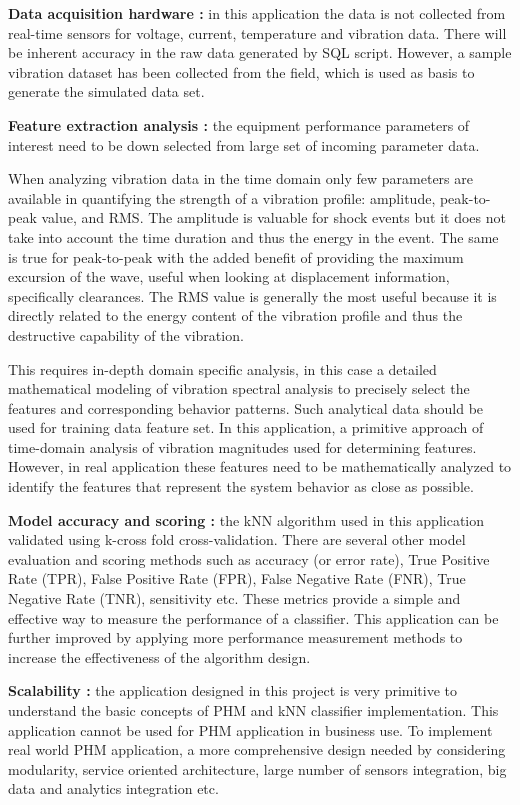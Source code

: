 \documentclass[sigconf]{acmart}
\begin{document}
\textbf{Data acquisition hardware :} in this application the data is not collected from real-time sensors for voltage, current, temperature and vibration data. There will be inherent accuracy in the raw data generated by SQL script. However, a sample vibration dataset has been collected from the field, which is used as basis to generate the simulated data set.

\textbf{Feature extraction analysis :} the equipment performance parameters of interest need to be down selected from large set of incoming parameter data. 


When analyzing vibration data in the time domain only few parameters are available in quantifying the strength of a vibration profile: amplitude, peak-to-peak value, and RMS.  
The amplitude is valuable for shock events but it does not take into account the time duration and thus the energy in the event. The same is true for peak-to-peak with the added benefit of providing the maximum excursion of the wave, useful when looking at displacement information, specifically clearances. The RMS value is generally the most useful because it is directly related to the energy content of the vibration profile and thus the destructive capability of the vibration.


This requires in-depth domain specific analysis, in this case a detailed mathematical modeling of vibration spectral analysis to precisely select the features and corresponding behavior patterns. Such analytical data should be used for training data feature set. In this application, a primitive approach of time-domain analysis of vibration magnitudes used for determining features. However, in real application these features need to be mathematically analyzed to identify the features that represent the system behavior as close as possible.

\textbf{Model accuracy and scoring :} the kNN algorithm used in this application validated using k-cross fold cross-validation. There are several other model evaluation and scoring methods such as accuracy (or error rate), True Positive Rate (TPR), False Positive Rate (FPR), False Negative Rate (FNR), True Negative Rate (TNR), sensitivity etc. These metrics provide a simple and effective way to measure the performance of a classifier. This application can be further improved by applying more performance measurement methods to increase the effectiveness of the algorithm design.   

\textbf{Scalability :} the application designed in this project is very primitive to understand the basic concepts of PHM and kNN classifier implementation. This application cannot be used for PHM application in business use. To implement real world PHM application, a more comprehensive design needed by considering modularity, service oriented architecture, large number of sensors integration, big data and analytics integration etc.
\end{document}
